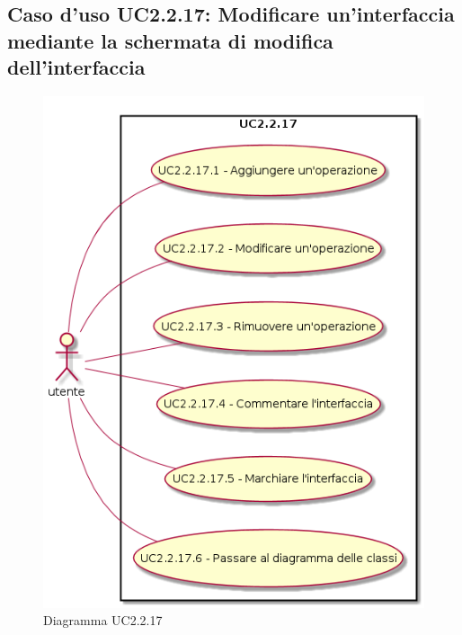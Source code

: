 \documentclass[../AnalisiDeiRequisiti.tex]{subfiles}
\begin{document}
			\subsection{Caso d'uso UC2.2.17: Modificare un'interfaccia mediante la schermata di modifica dell'interfaccia}
			\begin{figure} [H]
				\centering
				\includegraphics[scale=0.45]{./Figures/UC2.2.17.png}
				\caption{Diagramma UC2.2.17}\label{}
			\end{figure}
\end{document}
